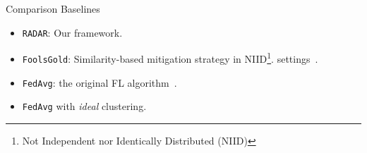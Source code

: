 \begin{frame}{Comparison Baselines}
      \begin{itemize}
        \item \texttt{RADAR}: Our framework.
        \item \texttt{FoolsGold}: Similarity-based mitigation strategy in NIID\footnote{Not Independent nor Identically Distributed (NIID)}. settings~\cite{fung_LimitationsFederatedLearning_2020}.
        \item \texttt{FedAvg}: the original FL algorithm~\cite{mcmahan_Communicationefficientlearningdeep_2017}.
        \item \texttt{FedAvg} with \emph{ideal} clustering.
      \end{itemize}
\end{frame}
